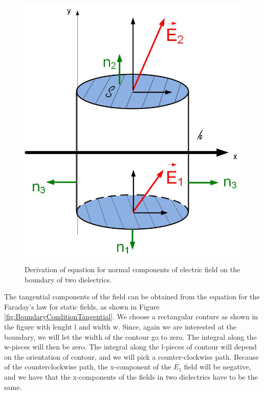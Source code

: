 \documentclass{ximera}
\begin{document}
\begin{figure}[htbp]
\begin{center}
\includegraphics[scale=0.5]{../jpg/BoundaryConditionsNormal.jpg}
\end{center}
\caption{Derivation of equation for normal components of electric field on the boundary of two dielectrics.}
\label{fig:BoundaryConditionNormal}
\end{figure}


The tangential components of the field can be obtained from the equation for the Faraday's law for static fields, as shown in Figure \ref{fig:BoundaryConditionTangential}. We choose a rectangular conture as shown in the figure with lenght l and width w. Since, again we are interested at the boundary, we will let the width of the contour go to zero. The integral along the w-pieces will then be zero. The integral along the l-pieces of contour will depend on the orientation of contour, and we will pick a counter-clockwise path. Because of the counterclockwise path, the x-component of the $E_1$ field will be negative, and we have that the x-components of the fields in two dielectrics have to be the same.
\end{document}
